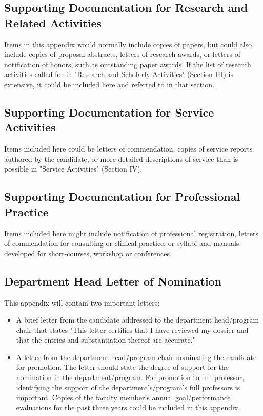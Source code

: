 \subsection*{Supporting Documentation for Research and Related Activities}
Items in this appendix would normally include copies of papers, but could also include copies of proposal abstracts, letters of research awards, or letters of notification of honors, such as outstanding paper awards. If the list of research activities called for in "Research and Scholarly Activities" (Section III) is extensive, it could be included here and referred to in that section.

\subsection*{Supporting Documentation for Service Activities}
Items included here could be letters of commendation, copies of service reports authored by the candidate, or more detailed descriptions of service than is possible in "Service Activities" (Section IV).

\subsection*{Supporting Documentation for Professional Practice}
Items included here might include notification of professional registration, letters of commendation for consulting or clinical practice, or syllabi and manuals developed for short-courses, workshop or conferences.

\subsection*{Department Head Letter of Nomination}
This appendix will contain two important letters:

\begin{itemize}
\item A brief letter from the candidate addressed to the department head/program chair that states "This letter certifies that I have reviewed my dossier and that the entries and substantiation thereof are accurate."
\item A letter from the department head/program chair nominating the candidate for promotion. The letter should state the degree of support for the nomination in the department/program. For promotion to full professor, identifying the support of the department’s/program’s full professors is important. Copies of the faculty member’s annual goal/performance evaluations for the past three years could be included in this appendix.
\end{itemize}

